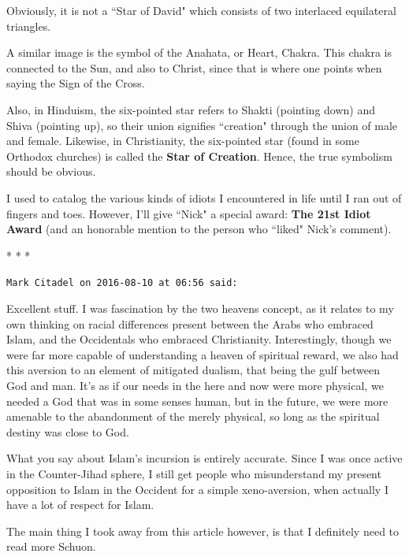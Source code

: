 Obviously, it is not a ``Star of David" which consists of two interlaced equilateral triangles.

A similar image is the symbol of the Anahata, or Heart, Chakra. This chakra is connected to the Sun, and also to Christ, since that is where one points when saying the Sign of the Cross.

Also, in Hinduism, the six-pointed star refers to Shakti (pointing down) and Shiva (pointing up), so their union signifies ``creation" through the union of male and female. Likewise, in Christianity, the six-pointed star (found in some Orthodox churches) is called the \textbf{Star of Creation}. Hence, the true symbolism should be obvious.

I used to catalog the various kinds of idiots I encountered in life until I ran out of fingers and toes. However, I'll give ``Nick" a special award: \textbf{The 21st Idiot Award} (and an honorable mention to the person who ``liked" Nick's comment).




\begin{center}* * *\end{center}

\begin{footnotesize}\begin{sffamily}



\texttt{Mark Citadel on 2016-08-10 at 06:56 said: }

Excellent stuff. I was fascination by the two heavens concept, as it relates to my own thinking on racial differences present between the Arabs who embraced Islam, and the Occidentals who embraced Christianity. Interestingly, though we were far more capable of understanding a heaven of spiritual reward, we also had this aversion to an element of mitigated dualism, that being the gulf between God and man. It's as if our needs in the here and now were more physical, we needed a God that was in some senses human, but in the future, we were more amenable to the abandonment of the merely physical, so long as the spiritual destiny was close to God.

What you say about Islam's incursion is entirely accurate. Since I was once active in the Counter-Jihad sphere, I still get people who misunderstand my present opposition to Islam in the Occident for a simple xeno-aversion, when actually I have a lot of respect for Islam.

The main thing I took away from this article however, is that I definitely need to read more Schuon.


\end{sffamily}\end{footnotesize}
